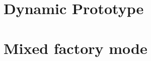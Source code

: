 \section{Dynamic Prototype}







\section{Mixed factory mode}



















































